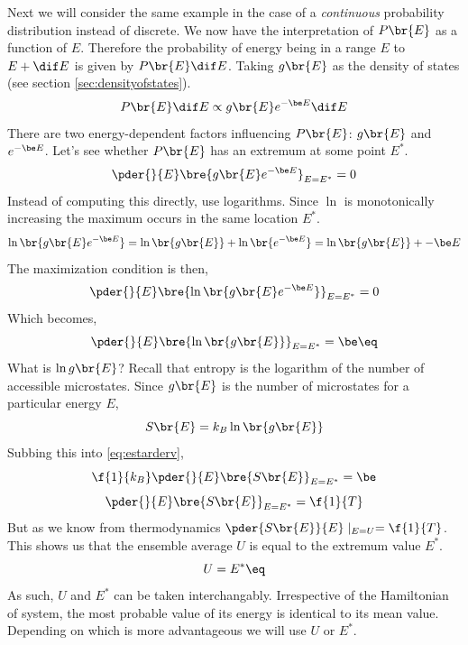 \documentclass{article}
\begin{document}
{Next we will consider the same example in the case of a \textit{continuous} probability distribution instead of discrete. We now have the interpretation of $P\br{E}$ as a function of $E$. Therefore the probability of energy being in a range $E$ to $E + \dif E$ is given by $P\br{E} \dif E$. Taking $g\br{E}$ as the density of states (see section \ref{sec:densityofstates}).
\[ P\br{E} \dif E \propto g\br{E} e^{-\be E} \dif E \]
There are two energy-dependent factors influencing $P\br{E}$: $g\br{E}$ and $e^{-\be E}$. Let's see whether $P\br{E}$ has an extremum at some point $E^*$.
\[ \pder{}{E}\bre{g\br{E} e^{-\be E}}_{E = E^*} = 0 \]
Instead of computing this directly, use logarithms. Since $\ln$ is monotonically increasing the maximum occurs in the same location $E^*$.
\[ \ln \br{g\br{E} e^{-\be E}} = \ln\br{g\br{E}} + \ln\br{e^{-\be E}} = \ln\br{g\br{E}} + -\be E \]
The maximization condition is then,
\[ \pder{}{E}\bre{\ln \br{g\br{E} e^{-\be E}}}_{E = E^*} = 0 \]
Which becomes,
\[ \pder{}{E}\bre{\ln \br{g\br{E}}}_{E = E^*} = \be \eq \label{eq:estarderv}\]
What is $\ln g\br{E}$? Recall that entropy is the logarithm of the number of accessible microstates. Since $g\br{E}$ is the number of microstates for a particular energy $E$,
\[ S\br{E} = k_B \ln\br{g\br{E}} \]
Subbing this into \eqref{eq:estarderv},
\[ \f{1}{k_B}\pder{}{E}\bre{S\br{E}}_{E = E^*} = \be \]
\[ \pder{}{E}\bre{S\br{E}}_{E = E^*} = \f{1}{T} \]
But as we know from thermodynamics $\pder{S\br{E}}{E} \mid_{E=U} = \f{1}{T}$. This shows us that the ensemble average $U$ is equal to the extremum value $E^*$.
\[ U = E^* \eq \label{eq:probableaverage}\]
As such, $U$ and $E^*$ can be taken interchangably. Irrespective of the Hamiltonian of system, the most probable value of its energy is identical to its mean value. Depending on which is more advantageous we will use $U$ or $E^*$.\\

}
\end{document}
